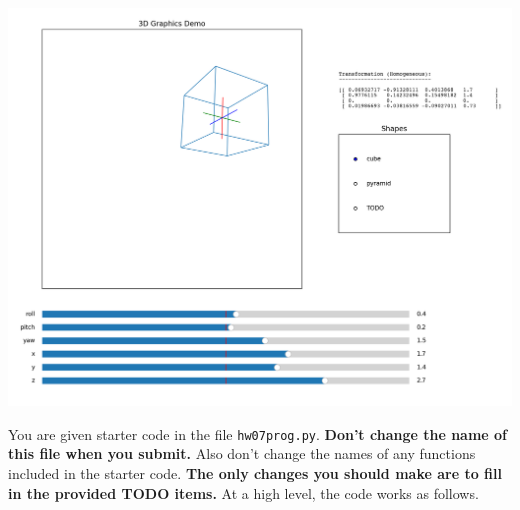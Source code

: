 \documentclass{article}
\theoremstyle{remark}
\begin{document}
\begin{center}
  \includegraphics[scale=.25]{demo-screenshot.png}
\end{center}
You are given starter code in the file \texttt{hw07prog.py}.
\textbf{Don't change the name of this file when you submit.}
Also don't change the names of any functions included in the starter code.
\textbf{The only changes you should make are to fill in the provided TODO items.}
At a high level, the code works as follows.
\end{document}
